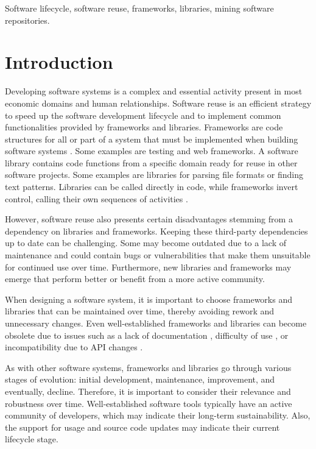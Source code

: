 \documentclass[10pt,conference,peerreview]{IEEEtran}
\begin{document}
\begin{IEEEkeywords}
    Software lifecycle, software reuse, frameworks, libraries, mining software repositories.
\end{IEEEkeywords}

\section{Introduction}
Developing software systems is a complex and essential activity present in most economic domains and human relationships. Software reuse is an efficient strategy to speed up the software development lifecycle and to implement common functionalities provided by frameworks and libraries.
Frameworks are code structures for all or part of a system that must be implemented when building software systems \cite{johnson1997}. Some examples are testing and web frameworks. A software library contains code functions from a specific domain ready for reuse in other software projects. Some examples are libraries for parsing file formats or finding text patterns. Libraries can be called directly in code, while frameworks invert control, calling their own sequences of activities \cite{johnson1988}.

However, software reuse also presents certain disadvantages stemming from a dependency on libraries and frameworks. Keeping these third-party dependencies up to date can be challenging. Some may become outdated due to a lack of maintenance and could contain bugs or vulnerabilities that make them unsuitable for continued use over time. Furthermore, new libraries and frameworks may emerge that perform better or benefit from a more active community.

When designing a software system, it is important to choose frameworks and libraries that can be maintained over time, thereby avoiding rework and unnecessary changes. Even well-established frameworks and libraries can become obsolete due to issues such as a lack of documentation  \cite{robillard2011,zhong2013}, difficulty of use \cite{nadi2016}, or incompatibility due to API changes \cite{mostafa2017,decan2019}.

As with other software systems, frameworks and libraries go through various stages of evolution: initial development, maintenance, improvement, and eventually, decline. Therefore, it is important to consider their relevance and robustness over time. Well-established software tools typically have an active community of developers, which may indicate their long-term sustainability. Also, the support for usage and source code updates may indicate their current lifecycle stage.
\end{document}
